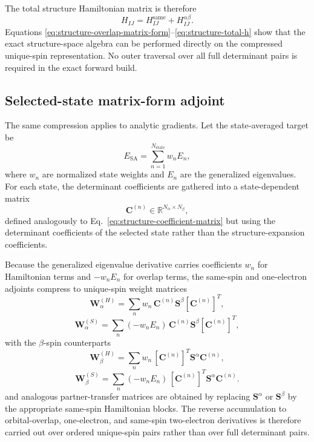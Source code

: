 \documentclass[journal=jctcce,manuscript=article]{achemso}
\newcommand{\na}{N_{\alpha}}
\newcommand{\nb}{N_{\beta}}
\newcommand{\nstate}{N_{\mathrm{state}}}
\newcommand{\Cmat}{\mathbf{C}}
\newcommand{\Sa}{\mathbf{S}^{\alpha}}
\newcommand{\Sb}{\mathbf{S}^{\beta}}
\newcommand{\wstate}{w_n}
\newcommand{\En}{E_n}
\begin{document}
The total structure Hamiltonian matrix is therefore
\begin{equation}
H_{IJ}
=
H^{\mathrm{same}}_{IJ}
+
H^{\alpha\beta}_{IJ}.
\label{eq:structure-total-h}
\end{equation}
Equations \eqref{eq:structure-overlap-matrix-form}--\eqref{eq:structure-total-h}
show that the exact structure-space algebra can be performed directly on the
compressed unique-spin representation. No outer traversal over all full
determinant pairs is required in the exact forward build.

\subsection{Selected-state matrix-form adjoint}
The same compression applies to analytic gradients. Let the state-averaged
target be
\begin{equation}
E_{\mathrm{SA}} = \sum_{n=1}^{\nstate} \wstate \En,
\label{eq:state-average-energy}
\end{equation}
where $\wstate$ are normalized state weights and $\En$ are the generalized
eigenvalues. For each state, the determinant coefficients are gathered into a
state-dependent matrix
\begin{equation}
\Cmat^{(n)} \in \mathbb{R}^{\na \times \nb},
\end{equation}
defined analogously to Eq.~\eqref{eq:structure-coefficient-matrix} but using
the determinant coefficients of the selected state rather than the
structure-expansion coefficients.

Because the generalized eigenvalue derivative carries coefficients $\wstate$
for Hamiltonian terms and $-\wstate \En$ for overlap terms, the same-spin and
one-electron adjoints compress to unique-spin weight matrices
\begin{equation}
\mathbf{W}^{(H)}_{\alpha}
=
\sum_n \wstate \,
\Cmat^{(n)} \Sb [\Cmat^{(n)}]^{T},
\label{eq:alpha-H-weight}
\end{equation}
\begin{equation}
\mathbf{W}^{(S)}_{\alpha}
=
\sum_n (-\wstate \En)\,
\Cmat^{(n)} \Sb [\Cmat^{(n)}]^{T},
\label{eq:alpha-S-weight}
\end{equation}
with the $\beta$-spin counterparts
\begin{equation}
\mathbf{W}^{(H)}_{\beta}
=
\sum_n \wstate \,
[\Cmat^{(n)}]^{T} \Sa \Cmat^{(n)},
\label{eq:beta-H-weight}
\end{equation}
\begin{equation}
\mathbf{W}^{(S)}_{\beta}
=
\sum_n (-\wstate \En)\,
[\Cmat^{(n)}]^{T} \Sa \Cmat^{(n)}.
\label{eq:beta-S-weight}
\end{equation}
and analogous partner-transfer matrices are obtained by replacing $\Sa$ or
$\Sb$ by the appropriate same-spin Hamiltonian blocks. The reverse
accumulation to orbital-overlap, one-electron, and same-spin two-electron
derivatives is therefore carried out over ordered unique-spin pairs rather than
over full determinant pairs.
\end{document}
